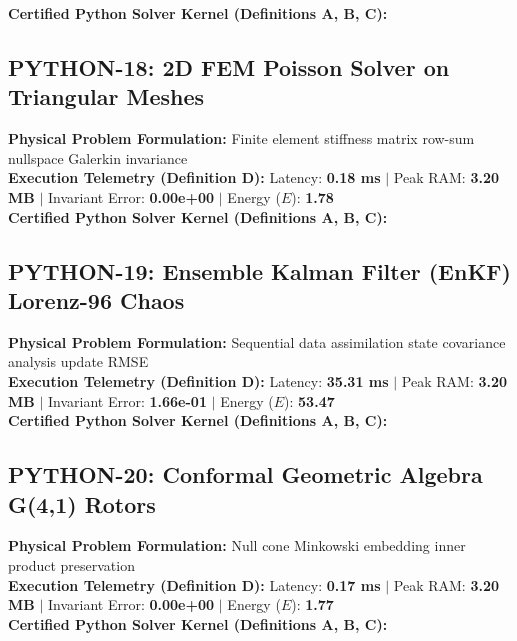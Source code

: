 \textbf{Certified Python Solver Kernel (Definitions A, B, C):}


\vspace{1em}
\subsection{PYTHON-18: 2D FEM Poisson Solver on Triangular Meshes}
\textbf{Physical Problem Formulation:} Finite element stiffness matrix row-sum nullspace Galerkin invariance\\
\textbf{Execution Telemetry (Definition D):} Latency: \textbf{0.18 ms} $|$ Peak RAM: \textbf{3.20 MB} $|$ Invariant Error: \textbf{0.00e+00} $|$ Energy ($E$): \textbf{1.78}\\

\textbf{Certified Python Solver Kernel (Definitions A, B, C):}


\vspace{1em}
\subsection{PYTHON-19: Ensemble Kalman Filter (EnKF) Lorenz-96 Chaos}
\textbf{Physical Problem Formulation:} Sequential data assimilation state covariance analysis update RMSE\\
\textbf{Execution Telemetry (Definition D):} Latency: \textbf{35.31 ms} $|$ Peak RAM: \textbf{3.20 MB} $|$ Invariant Error: \textbf{1.66e-01} $|$ Energy ($E$): \textbf{53.47}\\

\textbf{Certified Python Solver Kernel (Definitions A, B, C):}


\vspace{1em}
\subsection{PYTHON-20: Conformal Geometric Algebra G(4,1) Rotors}
\textbf{Physical Problem Formulation:} Null cone Minkowski embedding inner product preservation\\
\textbf{Execution Telemetry (Definition D):} Latency: \textbf{0.17 ms} $|$ Peak RAM: \textbf{3.20 MB} $|$ Invariant Error: \textbf{0.00e+00} $|$ Energy ($E$): \textbf{1.77}\\

\textbf{Certified Python Solver Kernel (Definitions A, B, C):}



